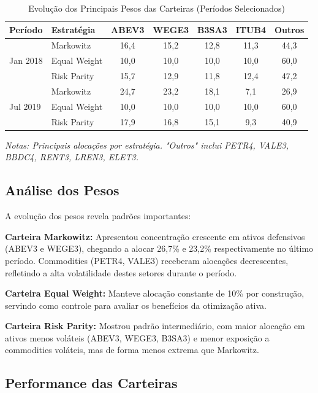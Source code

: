 \begin{table}[H]
\centering
\caption{Evolução dos Principais Pesos das Carteiras (Períodos Selecionados)}
\scriptsize
\begin{tabular}{|l|l|c|c|c|c|c|}
\hline
\textbf{Período} & \textbf{Estratégia} & \textbf{ABEV3} & \textbf{WEGE3} & \textbf{B3SA3} & \textbf{ITUB4} & \textbf{Outros} \\
\hline
\multirow{3}{*}{Jan 2018} & Markowitz & 16,4 & 15,2 & 12,8 & 11,3 & 44,3 \\
\cline{2-7}
& Equal Weight & 10,0 & 10,0 & 10,0 & 10,0 & 60,0 \\
\cline{2-7}
& Risk Parity & 15,7 & 12,9 & 11,8 & 12,4 & 47,2 \\
\hline
\multirow{3}{*}{Jul 2019} & Markowitz & 24,7 & 23,2 & 18,1 & 7,1 & 26,9 \\
\cline{2-7}
& Equal Weight & 10,0 & 10,0 & 10,0 & 10,0 & 60,0 \\
\cline{2-7}
& Risk Parity & 17,9 & 16,8 & 15,1 & 9,3 & 40,9 \\
\hline
\end{tabular}
\normalsize
\textit{Notas: Principais alocações por estratégia. "Outros" inclui PETR4, VALE3, BBDC4, RENT3, LREN3, ELET3.}
\label{tab:portfolio_weights}
\end{table}

\subsection{Análise dos Pesos}

A evolução dos pesos revela padrões importantes:

\textbf{Carteira Markowitz:} Apresentou concentração crescente em ativos defensivos (ABEV3 e WEGE3), chegando a alocar 26,7\% e 23,2\% respectivamente no último período. Commodities (PETR4, VALE3) receberam alocações decrescentes, refletindo a alta volatilidade destes setores durante o período.

\textbf{Carteira Equal Weight:} Manteve alocação constante de 10\% por construção, servindo como controle para avaliar os benefícios da otimização ativa.

\textbf{Carteira Risk Parity:} Mostrou padrão intermediário, com maior alocação em ativos menos voláteis (ABEV3, WEGE3, B3SA3) e menor exposição a commodities voláteis, mas de forma menos extrema que Markowitz.

\subsection{Performance das Carteiras}

